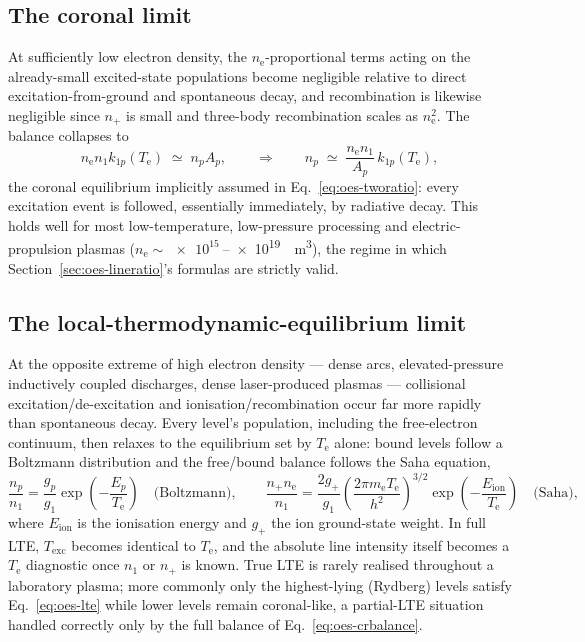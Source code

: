 \subsection{The coronal limit}

At sufficiently low electron density, the $n_{\mathrm{e}}$-proportional terms acting on the already-small excited-state populations become negligible relative to direct excitation-from-ground and spontaneous decay, and recombination is likewise negligible since $n_{+}$ is small and three-body recombination scales as $n_{\mathrm{e}}^{2}$. The balance collapses to
\begin{equation}
n_{\mathrm{e}} n_{1} k_{1p}(T_{\mathrm{e}}) \;\simeq\; n_{p} A_{p},
\qquad\Longrightarrow\qquad
n_{p} \;\simeq\; \frac{n_{\mathrm{e}} n_{1}}{A_{p}}\, k_{1p}(T_{\mathrm{e}}),
\label{eq:oes-coronal}
\end{equation}
the coronal equilibrium implicitly assumed in Eq.~\eqref{eq:oes-tworatio}: every excitation event is followed, essentially immediately, by radiative decay. This holds well for most low-temperature, low-pressure processing and electric-propulsion plasmas ($n_{\mathrm{e}}\sim\SI{e15}{}$–\SI{e19}{\per\cubic\metre}), the regime in which Section~\ref{sec:oes-lineratio}'s formulas are strictly valid.

\subsection{The local-thermodynamic-equilibrium limit}

At the opposite extreme of high electron density — dense arcs, elevated-pressure inductively coupled discharges, dense laser-produced plasmas — collisional excitation/de-excitation and ionisation/recombination occur far more rapidly than spontaneous decay. Every level's population, including the free-electron continuum, then relaxes to the equilibrium set by $T_{\mathrm{e}}$ alone: bound levels follow a Boltzmann distribution and the free/bound balance follows the Saha equation,
\begin{equation}
\frac{n_{p}}{n_{1}} = \frac{g_{p}}{g_{1}} \exp\!\left(-\frac{E_{p}}{T_{\mathrm{e}}}\right)
\quad\text{(Boltzmann)}, \qquad
\frac{n_{+} n_{\mathrm{e}}}{n_{1}} = \frac{2 g_{+}}{g_{1}} \left(\frac{2\pi m_{\mathrm{e}} T_{\mathrm{e}}}{h^{2}}\right)^{3/2} \exp\!\left(-\frac{E_{\mathrm{ion}}}{T_{\mathrm{e}}}\right)
\quad\text{(Saha)},
\label{eq:oes-lte}
\end{equation}
where $E_{\mathrm{ion}}$ is the ionisation energy and $g_{+}$ the ion ground-state weight. In full LTE, $T_{\mathrm{exc}}$ becomes identical to $T_{\mathrm{e}}$, and the absolute line intensity itself becomes a $T_{\mathrm{e}}$ diagnostic once $n_{1}$ or $n_{+}$ is known. True LTE is rarely realised throughout a laboratory plasma; more commonly only the highest-lying (Rydberg) levels satisfy Eq.~\eqref{eq:oes-lte} while lower levels remain coronal-like, a partial-LTE situation handled correctly only by the full balance of Eq.~\eqref{eq:oes-crbalance}.

